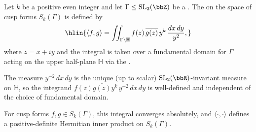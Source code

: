 \begin{definition} \label{definition:petersson_inner_product_on_cusp_forms}
Let $k$ be a positive even integer and let $\Gamma \leq \mathrm{SL}_2(\bbZ)$ be a . The  on the space of cusp forms $S_k(\Gamma)$ is defined by
$$\hlin{\langle f, g \rangle = \iint_{\Gamma \backslash \mathbb{H}} f(z) \, \overline{g(z)} \, y^k \, \frac{dx \, dy}{y^2},}$$
where $z = x + iy$ and the integral is taken over a fundamental domain for $\Gamma$ acting on the upper half-plane $\mathbb{H}$ via the .

The measure $y^{-2} \, dx \, dy$ is the unique (up to scalar) $\mathrm{SL}_2(\bbR)$-invariant measure on $\mathbb{H}$, so the integrand $f(z)\overline{g(z)} y^k \, y^{-2}\,dx\,dy$ is well-defined and independent of the choice of fundamental domain.

For cusp forms $f, g \in S_k(\Gamma)$, this integral converges absolutely, and $\langle \cdot, \cdot \rangle$ defines a positive-definite Hermitian inner product on $S_k(\Gamma)$.

\end{definition}
